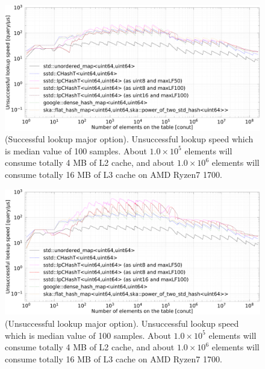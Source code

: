 \begin{figure}[h]
  \hspace{-3mm}
  \includegraphics[scale=0.24]{./fig_bench_sm/find_unsuccessful_lookup_med.pdf}
  \caption{
    (Successful lookup major option). Unsuccessful lookup speed which is median value of 100 samples.
    About $1.0\times10^5$ elements will consume totally 4 MB of L2 cache,
    and about $1.0\times10^6$ elements will consume totally 16 MB of L3 cache on AMD Ryzen7 1700.
  }
  \label{fig_bench_find_us_sm}
\end{figure}

\begin{figure}[h]
  \hspace{-3mm}
  \includegraphics[scale=0.24]{./fig_bench_usm/find_unsuccessful_lookup_med.pdf}
  \caption{
    (Unsuccessful lookup major option). Unsuccessful lookup speed which is median value of 100 samples.
    About $1.0\times10^5$ elements will consume totally 4 MB of L2 cache,
    and about $1.0\times10^6$ elements will consume totally 16 MB of L3 cache on AMD Ryzen7 1700.
  }
  \label{fig_bench_find_us_um}
\end{figure}


